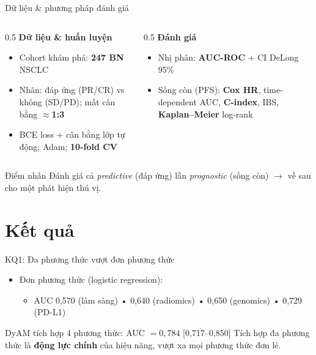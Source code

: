 \documentclass[aspectratio=169,11pt]{beamer}
\begin{document}
\begin{frame}{Dữ liệu \& phương pháp đánh giá}
  \begin{columns}[T]
    \begin{column}{0.5\textwidth}
      \textbf{Dữ liệu \& huấn luyện}
      \begin{itemize}
        \item Cohort khám phá: \textbf{247 BN} NSCLC
        \item Nhãn: đáp ứng (PR/CR) vs không (SD/PD); mất cân bằng \textbf{$\approx$1:3}
        \item BCE loss + cân bằng lớp tự động; Adam; \textbf{10-fold CV}
      \end{itemize}
    \end{column}
    \begin{column}{0.5\textwidth}
      \textbf{Đánh giá}
      \begin{itemize}
        \item Nhị phân: \textbf{AUC-ROC} + CI DeLong 95\%
        \item Sống còn (PFS): \textbf{Cox HR}, time-dependent AUC, \textbf{C-index}, IBS, \textbf{Kaplan–Meier} log-rank
      \end{itemize}
    \end{column}
  \end{columns}
  \vfill
  \begin{block}{Điểm nhấn}
    Đánh giá cả \textit{predictive} (đáp ứng) lẫn \textit{prognostic} (sống còn) $\rightarrow$ về sau cho một phát hiện thú vị.
  \end{block}
\end{frame}

\section{Kết quả}

\begin{frame}{KQ1: Đa phương thức vượt đơn phương thức}
  \begin{itemize}
    \item Đơn phương thức (logistic regression):
    \begin{itemize}
      \item AUC 0,570 (lâm sàng) • 0,640 (radiomics) • 0,650 (genomics) • 0,729 (PD-L1)
    \end{itemize}
  \end{itemize}
  \vfill
  \begin{alertblock}{DyAM tích hợp 4 phương thức: AUC $= 0{,}784$ [0,717–0,850]}
    Tích hợp đa phương thức là \textbf{động lực chính} của hiệu năng, vượt xa mọi phương thức đơn lẻ.
  \end{alertblock}
\end{frame}
\end{document}
